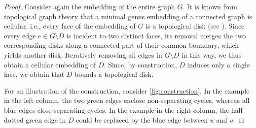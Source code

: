 \documentclass[a4paper,cleveref, autoref, thm-restate, thm-restate, UKenglish]{lipics-v2021}
\begin{document}
\begin{proof}
Consider again the embedding of the entire graph $G$. 
It is known from topological graph theory that a minimal genus embedding of a connected graph is cellular, i.e., every face of the embedding of $G$ is a topological disk \cite{youngs63} (see \cite[Proposition 3.4.1]{mohar}). 
Since every edge $e \in G \setminus D$ is incident to two distinct faces, its removal merges the two corresponding disks along a connected part of their common boundary, which yields another disk.
Iteratively removing all edges in $G \setminus D$ in this way, we thus obtain a cellular embedding of $D$. 
Since, by construction, $D$ induces only a single face, we obtain that $D$ bounds a topological disk.

For an illustration of the construction, consider \cref{fig:construction}. 
In the example in the left column, the two green edges enclose non-separating cycles, whereas all blue edges close separating cycles. 
In the example in the right column, the half-dotted green edge in $D$ could be replaced by the blue edge between $u$ and $v$.
\end{proof}
\end{document}
